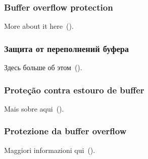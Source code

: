 \ifdefined\ENGLISH
\subsubsection{Buffer overflow protection}

More about it here~().
\fi

\ifdefined\RUSSIAN
\subsubsection{Защита от переполнений буфера}

Здесь больше об этом~().
\fi

\ifdefined\BRAZILIAN
\subsubsection{Proteção contra estouro de buffer}

Mais sobre aqui~().
\fi

\ifdefined\ITALIAN
\subsubsection{Protezione da buffer overflow}

Maggiori informazioni qui~().
\fi

